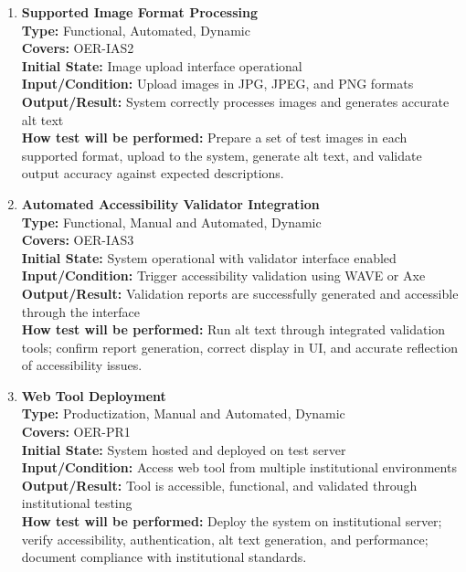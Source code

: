 \documentclass[12pt, titlepage]{article}
\begin{document}
\begin{enumerate}[label=NFR-ST \arabic*., wide=0pt, leftmargin=*]
  \item \textbf{Supported Image Format Processing} \\[2mm]
    \textbf{Type:} Functional, Automated, Dynamic \\
    \textbf{Covers:} OER-IAS2 \\
    \textbf{Initial State:} Image upload interface operational \\
    \textbf{Input/Condition:} Upload images in JPG, JPEG, and PNG formats \\
    \textbf{Output/Result:} System correctly processes images and
    generates accurate alt text \\[2mm]
    \textbf{How test will be performed:}
    Prepare a set of test images in each supported format, upload to
    the system, generate alt text, and validate output accuracy
    against expected descriptions.

  \item \textbf{Automated Accessibility Validator Integration} \\[2mm]
    \textbf{Type:} Functional, Manual and Automated, Dynamic \\
    \textbf{Covers:} OER-IAS3 \\
    \textbf{Initial State:} System operational with validator
    interface enabled \\
    \textbf{Input/Condition:} Trigger accessibility validation using
    WAVE or Axe \\
    \textbf{Output/Result:} Validation reports are successfully
    generated and accessible through the interface \\[2mm]
    \textbf{How test will be performed:}
    Run alt text through integrated validation tools; confirm report
    generation, correct display in UI, and accurate reflection of
    accessibility issues.

  \item \textbf{Web Tool Deployment} \\[2mm]
    \textbf{Type:} Productization, Manual and Automated, Dynamic \\
    \textbf{Covers:} OER-PR1 \\
    \textbf{Initial State:} System hosted and deployed on test server \\
    \textbf{Input/Condition:} Access web tool from multiple
    institutional environments \\
    \textbf{Output/Result:} Tool is accessible, functional, and
    validated through institutional testing \\[2mm]
    \textbf{How test will be performed:}
    Deploy the system on institutional server; verify accessibility,
    authentication, alt text generation, and performance; document
    compliance with institutional standards.


\end{enumerate}
\end{document}
